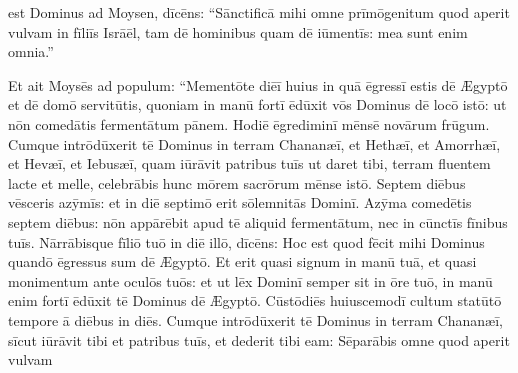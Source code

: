 

\thispagestyle{empty}

 est Dominus ad Moysen, dīcēns: ``Sānctificā mihi omne prīmōgenitum quod
aperit vulvam in fīliīs Isrāēl, tam dē
hominibus quam dē iūmentīs: mea sunt enim omnia.''

Et ait
Moysēs ad populum: ``Mementōte diēī huius in
quā ēgressī estis dē Ægyptō et dē domō servitūtis, quoniam in manū fortī
ēdūxit vōs Dominus dē locō istō: ut nōn comedātis fermentātum pānem. Hodiē ēgrediminī mēnsē
novārum frūgum. Cumque intrōdūxerit tē Dominus in terram
Chananæī, et Hethæī, et Amorrhæī, et Hevæī, et Iebusæī,
quam iūrāvit patribus tuīs ut daret tibi, terram fluentem
lacte et melle, celebrābis hunc mōrem sacrōrum mēnse istō.
Septem diēbus vēsceris azȳmīs: et in diē septimō erit
sōlemnitās Dominī. Azȳma comedētis septem diēbus: nōn appārēbit
apud tē aliquid fermentātum, nec in cūnctīs fīnibus tuīs. Nārrābisque
fīliō tuō in diē illō, dīcēns: Hoc est quod fēcit mihi Dominus quandō
ēgressus sum dē Ægyptō. Et erit quasi signum in manū tuā, et quasi
monimentum ante oculōs tuōs: et ut lēx Dominī semper sit
in ōre tuō, in manū enim fortī ēdūxit tē Dominus dē Ægyptō. Cūstōdiēs
huiuscemodī cultum statūtō tempore ā diēbus in diēs. Cumque intrōdūxerit
tē Dominus in terram Chananæī, sīcut iūrāvit tibi et patribus tuīs, et
dederit tibi eam: Sēparābis omne quod aperit vulvam
